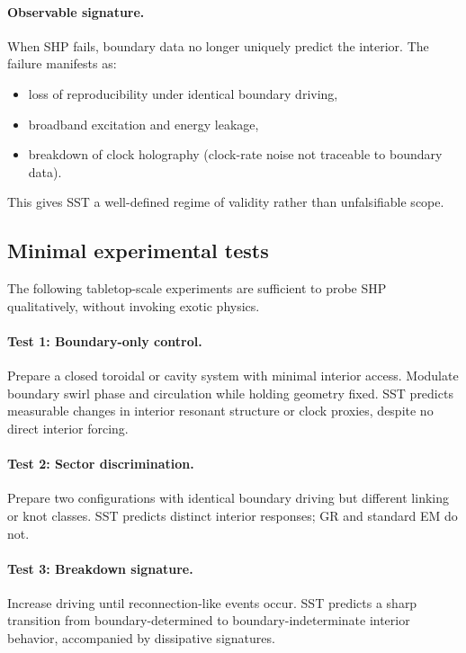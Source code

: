 \documentclass[11pt]{article}
\begin{document}
    \paragraph{Observable signature.}
        When SHP fails, boundary data no longer uniquely predict the interior. The failure
        manifests as:
        \begin{itemize}
            \item loss of reproducibility under identical boundary driving,
            \item broadband excitation and energy leakage,
            \item breakdown of clock holography (clock-rate noise not traceable to boundary data).
        \end{itemize}

        This gives SST a well-defined regime of validity rather than unfalsifiable scope.

    \subsection{Minimal experimental tests}

    The following tabletop-scale experiments are sufficient to probe SHP qualitatively,
    without invoking exotic physics.

    \paragraph{Test 1: Boundary-only control.}
        Prepare a closed toroidal or cavity system with minimal interior access. Modulate
        boundary swirl phase and circulation while holding geometry fixed. SST predicts
        measurable changes in interior resonant structure or clock proxies, despite no
        direct interior forcing.

    \paragraph{Test 2: Sector discrimination.}
        Prepare two configurations with identical boundary driving but different linking
        or knot classes. SST predicts distinct interior responses; GR and standard EM do not.

    \paragraph{Test 3: Breakdown signature.}
        Increase driving until reconnection-like events occur. SST predicts a sharp
        transition from boundary-determined to boundary-indeterminate interior behavior,
        accompanied by dissipative signatures.
\end{document}
